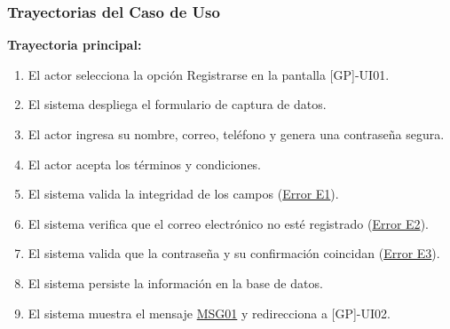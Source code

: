 \begin{appendices}
\subsubsection{Trayectorias del Caso de Uso}

\textbf{Trayectoria principal:}
\begin{enumerate}[nosep]
    \item El actor selecciona la opción Registrarse en la pantalla [GP]-UI01.
    \item El sistema despliega el formulario de captura de datos.
    \item El actor ingresa su nombre, correo, teléfono y genera una contraseña segura.
    \item El actor acepta los términos y condiciones.
    \item El sistema valida la integridad de los campos (\hyperlink{err:E1}{Error E1}).
    \item El sistema verifica que el correo electrónico no esté registrado (\hyperlink{err:E2}{Error E2}).
    \item El sistema valida que la contraseña y su confirmación coincidan (\hyperlink{err:E3}{Error E3}).
    \item El sistema persiste la información en la base de datos.
    \item El sistema muestra el mensaje \hyperlink{msg:MSG01}{MSG01} y redirecciona a [GP]-UI02.
\end{enumerate}


\end{appendices}

